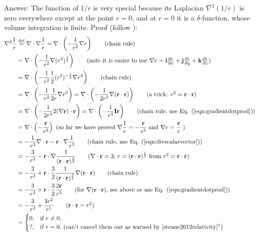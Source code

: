\documentclass[11pt]{article}              %
\begin{document}
Answer: The function of $1/r$ is very special because its Laplacian $\nabla^2 (1/r)$ is zero everywhere except at the point $r=0$, and at $r=0$ it is a $\delta$-function, whose volume integration is finite. Proof (follow \cite{steane2012relativity}): 
\begin{align}
	\nabla^2\frac{1}{r}&\stackrel{\operatorname{def}}{=}\nabla\cdot\nabla\frac{1}{r}=\nabla\cdot\left(-\frac{1}{r^2}\nabla r\right)\tag{chain rule}\\
    &=\nabla\cdot\left(-\frac{1}{r^2}\nabla (r^2)^\frac{1}{2}\right)\tag{note it is easier to use $\nabla r={\mathbf{i}\frac{\partial r}{\partial x}+\mathbf{j}\frac{\partial r}{\partial y}+\mathbf{k}\frac{\partial r}{\partial z}}$}\\
    &=\nabla\cdot\left(-\frac{1}{r^2}\frac{1}{2}(r^2)^{-\frac{1}{2}}\nabla r^2\right)\tag{chain rule}\\
	&=\nabla\cdot\left(-\frac{1}{r^2}\frac{1}{2r}\nabla r^2\right)=\nabla\cdot\left(-\frac{1}{2r^3}\nabla ({\mathbf r}\cdot{\mathbf r})\right)\tag{a trick: $r^2={\mathbf r}\cdot{\mathbf r}$}\\
	&=\nabla\cdot\left(-\frac{1}{2r^3}2(\nabla{\mathbf r})\cdot{\mathbf r}\right)=\nabla\cdot\left(-\frac{1}{r^3}{\mathbf I}{\mathbf r}\right)\tag{chain rule; use Eq. (\ref{eqn:gradientdotprod})}\\
	&=\nabla\cdot\left(-\frac{\mathbf r}{r^3}\right)\ \mbox{(so far we have proved }\nabla\frac{1}{r}=-\frac{\mathbf r}{r^3}\mbox{ and }\nabla r=\frac{\mathbf r}{r} \mbox{ )}\label{nablar}\\
	&=-\frac{1}{r^3}\nabla\cdot{\mathbf r}-{\mathbf r}\cdot\nabla\frac{1}{r^3}\tag{chain rule, use Eq. (\ref{eqn:divscalarvector})}\\
	&=-\frac{3}{r^3}-{\mathbf r}\cdot\nabla\frac{1}{({\mathbf r}\cdot{\mathbf r})^\frac{3}{2}}\tag{$\nabla\cdot{\mathbf r}=3$; $r=({\mathbf r}\cdot{\mathbf r})^\frac{1}{2}$ from $r^2={\mathbf r}\cdot{\mathbf r}$}\\
	&=-\frac{3}{r^3}+{\mathbf r}\cdot\frac{3}{2}\frac{1}{({\mathbf r}\cdot{\mathbf r})^\frac{5}{2}}\nabla({\mathbf r}\cdot{\mathbf r})\tag{chain rule}\\
	&=-\frac{3}{r^3}+{\mathbf r}\cdot\frac{3}{2}\frac{2{\mathbf r}}{r^5}\tag{for $\nabla({\mathbf r}\cdot{\mathbf r})$, see above or use Eq. (\ref{eqn:gradientdotprod})}\\
	&=-\frac{3}{r^3}+\frac{3r^2}{r^5}\tag{${\mathbf r}\cdot{\mathbf r}=r^2$}\\
        &=\begin{cases}
		0,& \text{if } r \neq 0,\\
		?,& \text{if } r = 0.\mbox{ (can't cancel them out as warned by \cite{steane2012relativity}\footnotemark)}
	\end{cases}\label{cancelzero}
\end{align}
\end{document}
